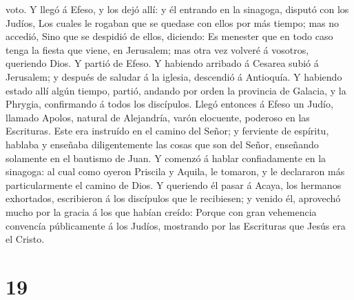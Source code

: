 voto.  Y llegó á Efeso, y los dejó allí: y él entrando en
la sinagoga, disputó con los Judíos,  Los cuales le rogaban
que se quedase con ellos por más tiempo; mas no accedió, 
Sino que se despidió de ellos, diciendo: Es menester que en todo caso
tenga la fiesta que viene, en Jerusalem; mas otra vez volveré á
vosotros, queriendo Dios. Y partió de Efeso.  Y habiendo
arribado á Cesarea subió á Jerusalem; y después de saludar á la iglesia,
descendió á Antioquía.  Y habiendo estado allí algún
tiempo, partió, andando por orden la provincia de Galacia, y la Phrygia,
confirmando á todos los discípulos.  Llegó entonces á Efeso
un Judío, llamado Apolos, natural de Alejandría, varón elocuente,
poderoso en las Escrituras.  Este era instruído en el
camino del Señor; y ferviente de espíritu, hablaba y enseñaba
diligentemente las cosas que son del Señor, enseñando solamente en el
bautismo de Juan.  Y comenzó á hablar confiadamente en la
sinagoga: al cual como oyeron Priscila y Aquila, le tomaron, y le
declararon más particularmente el camino de Dios.  Y
queriendo él pasar á Acaya, los hermanos exhortados, escribieron á los
discípulos que le recibiesen; y venido él, aprovechó mucho por la gracia
á los que habían creído:  Porque con gran vehemencia
convencía públicamente á los Judíos, mostrando por las Escrituras que
Jesús era el Cristo.

\hypertarget{section-18}{%
\section{19}\label{section-18}}

